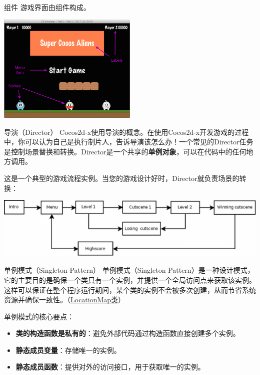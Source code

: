 \documentclass{beamer}
\newcommand{\hrefcol}[2]{\textcolor{cyan}{\href{#1}{#2}}}
\begin{document}
\begin{frame}[fragile]{组件}
游戏界面由组件构成。

\vspace{1em}

\includegraphics[width=0.5\textwidth]
{figures/components}
\end{frame}


\begin{frame}[fragile]{导演（Director）}
Cocos2d-x使用导演的概念。在使用Cocos2d-x开发游戏的过程中，你可以认为自己是执行制片人，告诉导演该怎么办！一个常见的Director任务是控制场景替换和转换。Director是一个共享的\textbf{单例对象}，可以在代码中的任何地方调用。

\vspace{1em}

这是一个典型的游戏流程实例。当您的游戏设计好时，Director就负责场景的转换：

\vspace{1em}

\includegraphics[width=\textwidth]
{figures/director}
\end{frame}


\begin{frame}[fragile]{单例模式（Singleton Pattern）}
单例模式（Singleton Pattern）是一种设计模式，它的主要目的是确保一个类只有一个实例，并提供一个全局访问点来获取该实例。这样可以保证在整个程序运行期间，某个类的实例不会被多次创建，从而节省系统资源并确保一致性。（\hrefcol{https://github.com/MinmusLin/Teamfight_Tactics/tree/main/src/Classes/LocationMap}{LocationMap类}）

\vspace{1em}

单例模式的核心要点：
\begin{itemize}
\item \textbf{类的构造函数是私有的}：避免外部代码通过构造函数直接创建多个实例。
\item \textbf{静态成员变量}：存储唯一的实例。
\item \textbf{静态成员函数}：提供对外的访问接口，用于获取唯一的实例。
\end{itemize}
\end{frame}
\end{document}
